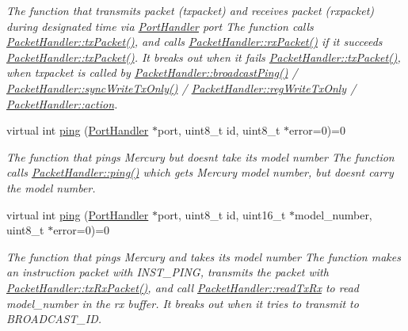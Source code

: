 \begin{DoxyCompactItemize}
\begin{DoxyCompactList}\small\item\em The function that transmits packet (txpacket) and receives packet (rxpacket) during designated time via \hyperlink{classmercury_1_1_port_handler}{Port\+Handler} port  The function calls \hyperlink{classmercury_1_1_packet_handler_acc3f84f0d952dc2d827d8500de512abe}{Packet\+Handler\+::tx\+Packet()},  and calls \hyperlink{classmercury_1_1_packet_handler_a01a3929c3514eac14b4ca5a61b498e20}{Packet\+Handler\+::rx\+Packet()} if it succeeds \hyperlink{classmercury_1_1_packet_handler_acc3f84f0d952dc2d827d8500de512abe}{Packet\+Handler\+::tx\+Packet()}.  It breaks out  when it fails \hyperlink{classmercury_1_1_packet_handler_acc3f84f0d952dc2d827d8500de512abe}{Packet\+Handler\+::tx\+Packet()},  when txpacket is called by \hyperlink{classmercury_1_1_packet_handler_aae8b5fb10e57973884589a0318e30fad}{Packet\+Handler\+::broadcast\+Ping()} / \hyperlink{classmercury_1_1_packet_handler_aa4c16ce358c78638f49f6dc1b5b141bd}{Packet\+Handler\+::sync\+Write\+Tx\+Only()} / \hyperlink{classmercury_1_1_packet_handler_a0b0daaabd6473e14b2fbfbbf3260bc7b}{Packet\+Handler\+::reg\+Write\+Tx\+Only} / \hyperlink{classmercury_1_1_packet_handler_a2ce31bd650d032c4bff957c9e453f38e}{Packet\+Handler\+::action}. \end{DoxyCompactList}\item 
virtual int \hyperlink{classmercury_1_1_packet_handler_a5fce347ac1f55de301e50bac01c58f4f}{ping} (\hyperlink{classmercury_1_1_port_handler}{Port\+Handler} $\ast$port, uint8\+\_\+t id, uint8\+\_\+t $\ast$error=0)=0
\begin{DoxyCompactList}\small\item\em The function that pings Mercury but doesn\textquotesingle{}t take its model number  The function calls \hyperlink{classmercury_1_1_packet_handler_a5fce347ac1f55de301e50bac01c58f4f}{Packet\+Handler\+::ping()} which gets Mercury model number,  but doesn\textquotesingle{}t carry the model number. \end{DoxyCompactList}\item 
virtual int \hyperlink{classmercury_1_1_packet_handler_a10c18ef1d19f531f71c3996f10b6426d}{ping} (\hyperlink{classmercury_1_1_port_handler}{Port\+Handler} $\ast$port, uint8\+\_\+t id, uint16\+\_\+t $\ast$model\+\_\+number, uint8\+\_\+t $\ast$error=0)=0
\begin{DoxyCompactList}\small\item\em The function that pings Mercury and takes its model number  The function makes an instruction packet with I\+N\+S\+T\+\_\+\+P\+I\+NG,  transmits the packet with \hyperlink{classmercury_1_1_packet_handler_ac7ceeaec210827d119199144badaad3a}{Packet\+Handler\+::tx\+Rx\+Packet()},  and call \hyperlink{classmercury_1_1_packet_handler_ac743a57bba9e71aadb1578f0e704f166}{Packet\+Handler\+::read\+Tx\+Rx} to read model\+\_\+number in the rx buffer.  It breaks out  when it tries to transmit to B\+R\+O\+A\+D\+C\+A\+S\+T\+\_\+\+ID. \end{DoxyCompactList}\item 

\end{DoxyCompactItemize}
